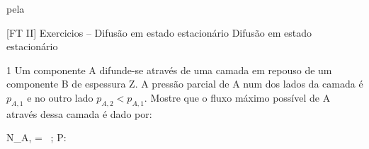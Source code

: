 \documentclass[\mainfilename]{subfiles}
\begin{document}
pela

[FT II]
{Exercicios -- Difusão em estado estacionário} %
{Difusão em estado estacionário} %

\begin{questionBox}1{ %
    Um componente A difunde-se através de uma camada em repouso de um componente B de espessura Z. A pressão parcial de A num dos lados da camada é \(p_{A,1}\) e no outro lado \(p_{A,2} < p_{A,1}\).
} %
    Mostre que o fluxo máximo possível de A através dessa camada é dado por:
    \begin{BM}
        N_{A,\max}
        = 
        \,\ln{}
        ;\qquad
        P:
    \end{BM}


\end{questionBox}
\end{document}
